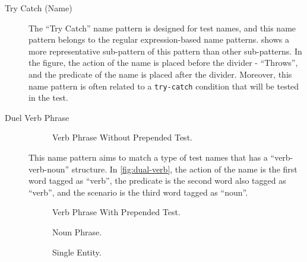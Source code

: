 \documentclass[proposal.tex]{subfiles}
\begin{document}
\begin{description}
\item[Try Catch (Name)]

The \enquote{Try Catch} name pattern is designed for test names, and this name pattern belongs to the regular expression-based name patterns.
%
 shows a more representative sub-pattern of this pattern than other sub-patterns.
%
In the figure, the action of the name is placed before the divider - \enquote{Throws}, and the predicate of the name is placed after the divider.
%
Moreover, this name pattern is often related to a \texttt{try-catch} condition that will be tested in the test.

\item[Duel Verb Phrase]

\begin{figure}[t]
\centering
    \begin{subfigure}{0.65\textwidth}
    \end{subfigure}
\caption{Verb Phrase Without Prepended Test.}
\label{fig:verb-without-test}
\end{figure}

This name pattern aims to match a type of test names that has a \enquote{verb-verb-noun} structure.
%
In \cref{fig:dual-verb}, the action of the name is the first word tagged as \enquote{verb}, the predicate is the second word also tagged as \enquote{verb}, and the scenario is the third word tagged as \enquote{noun}.

\begin{figure}[H]
\centering
    \begin{subfigure}{0.65\textwidth}
    \end{subfigure}
\caption{Verb Phrase With Prepended Test.}
\label{fig:verb-with-test}
\end{figure}

\begin{figure}[H]
\centering
     \begin{subfigure}{0.65\textwidth}
    \end{subfigure}
\caption{Noun Phrase.}
 \label{fig:noun-phrase}
\end{figure}

\begin{figure}[H]
\centering
     \begin{subfigure}{0.65\textwidth}
    \end{subfigure}
\caption{Single Entity.}
\label{fig:single-entity}
\end{figure}


\end{description}
\end{document}
